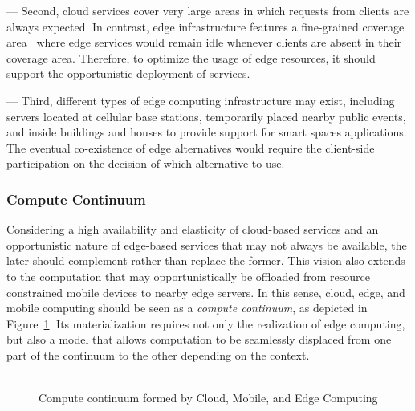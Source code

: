
--- Second, cloud services cover very large areas in which requests from clients are always expected. In contrast, edge infrastructure features a fine-grained coverage area~\cite{Dehos14millimeter5g} where edge services would remain idle whenever clients are absent in their coverage area. Therefore, to optimize the usage of edge resources, it should support the opportunistic deployment of services.


--- Third, different types of edge computing infrastructure may exist, including servers located at cellular base stations, temporarily placed nearby public events, and inside buildings and houses to provide support for smart spaces applications. The eventual co-existence of edge alternatives would require the client-side participation on the decision of which alternative to use.


\subsubsection*{Compute Continuum}

Considering a high availability and elasticity of cloud-based services and an opportunistic nature of edge-based services that may not always be available, the later should complement rather than replace the former. This vision also extends to the computation that may opportunistically be offloaded from resource constrained mobile devices to nearby edge servers. In this sense, cloud, edge, and mobile computing should be seen as a \textit{compute continuum}, as depicted in Figure~\ref{fig:continuum}. Its materialization requires not only the realization of edge computing, but also a model that allows computation to be seamlessly displaced from one part of the continuum to the other depending on the context. 

\begin{figure}[tbp]
	\includegraphics[width=0.0\textwidth]{figs/continuum.png}
	\caption{Compute continuum formed by Cloud, Mobile, and Edge Computing}
	\label{fig:continuum}
\end{figure}
 



